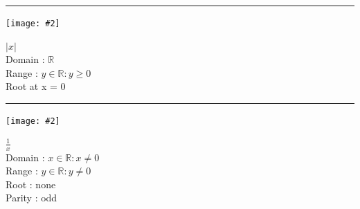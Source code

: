 \documentclass[10pt,onecolumn]{article}
\newenvironment{descrFunction}[2][.6]{\par\addvspace{\medskipamount}\noindent\rule{\linewidth}{.4pt}\par%
\begin{minipage}{0.45\linewidth}\centering\texttt{[image: \#2]}\end{minipage}\hfill%
\begin{minipage}{.45\linewidth}\centering
}{\end{minipage}\par}
\begin{document}
\begin{descrFunction}{graph_abs_x}
$\left|x\right|$\\
  Domain : $\mathbb{R}$ \\
  Range : $y \in \mathbb{R} : y \ge 0$ \\
  Root at x = 0
\end{descrFunction}

\begin{descrFunction}[1]{graph_1_over_x}
$\frac{1}{x}$\\
  Domain : $x \in \mathbb{R} : x \ne 0$ \\
  Range : $y \in \mathbb{R} : y \ne 0$ \\
  Root : none\\
  Parity : odd
\end{descrFunction}
\end{document}
